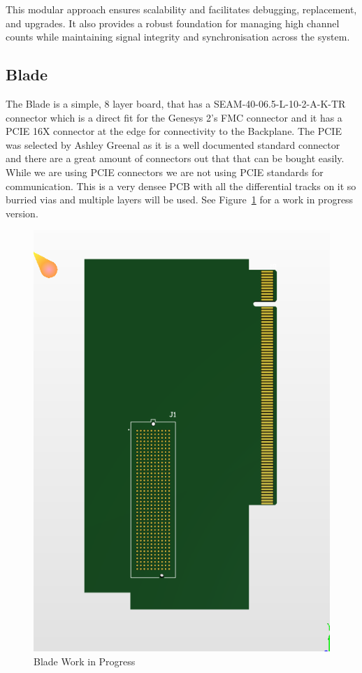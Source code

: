 \documentclass[a4paper,11pt]{article}
\begin{document}
This modular approach ensures scalability and facilitates debugging, replacement, and upgrades. It also provides a robust foundation for managing high channel counts while maintaining signal integrity and synchronisation across the system.

\subsection{Blade}

The Blade is a simple, 8 layer board, that has a SEAM-40-06.5-L-10-2-A-K-TR \cite{SamtecSeam} connector which is a direct fit for the Genesys 2's FMC connector and it has a PCIE 16X connector at the edge for connectivity to the Backplane. The PCIE was selected by Ashley Greenal as it is a well documented standard connector and there are a great amount of connectors out that that can be bought easily. While we are using PCIE connectors we are not using PCIE standards for communication. This is a very densee PCB with all the differential tracks on it so burried vias and multiple layers will be used. See Figure~\ref{fig:BladeWIP} for a work in progress version.

\begin{figure}[htbp]
\centering
\includegraphics[scale=0.5]{G2BladeWIP.png}
\caption{Blade Work in Progress\label{fig:BladeWIP}}
\end{figure}
\end{document}

